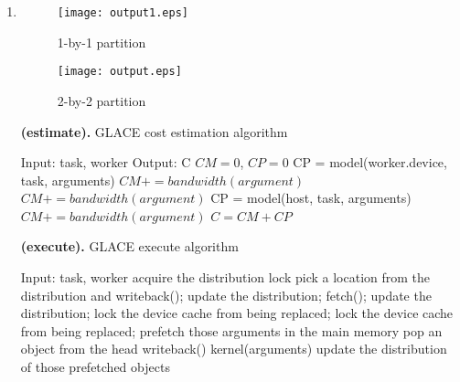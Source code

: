 \documentclass[preprint,11pt]{elsarticle}
\begin{document}
\begin{enumerate}
\item
\begin{figure}
  \centering
  \texttt{[image: output1.eps]} 
  \caption{1-by-1 partition}
  \label{fig:dep1}
\end{figure}
\begin{figure}
  \centering
  \texttt{[image: output.eps]} 
  \caption{2-by-2 partition}
  \label{fig:dep2}
\end{figure}

\begin{algorithm}
\caption{{\bf (estimate).} GLACE cost estimation algorithm}
\label{alg:est}
\begin{algorithmic}
\STATE Input: task, worker
\STATE Output: C
\STATE $CM = 0$, $CP = 0$
  \STATE CP = model(worker.device, task, arguments)
      \STATE $CM += bandwidth(argument)$
        \STATE $CM += bandwidth(argument)$
      \ENDIF
    \ENDIF
  \ENDFOR 
\ELSE
  \STATE CP = model(host, task, arguments)
      \STATE $CM += bandwidth(argument)$
    \ENDIF
  \ENDFOR 
\ENDIF
\STATE $C = CM + CP$
\end{algorithmic}
\end{algorithm}

\begin{algorithm}
\caption{{\bf (execute).} GLACE execute algorithm}
\label{alg:exe}
\begin{algorithmic}
\STATE Input: task, worker
  \STATE acquire the distribution lock
        \STATE pick a location from the distribution and writeback();
        \STATE update the distribution;
      \ENDIF
        \STATE fetch();
        \STATE update the distribution;
      \ENDIF
      \STATE lock the device cache from being replaced; 
    \ELSE
      \STATE lock the device cache from being replaced; 
    \ENDIF
  \ENDIF
\ENDFOR
{}
  \STATE prefetch those arguments in the main memory
\ENDIF
{}
  \STATE pop an object from the head
  \STATE writeback() 
\ENDIF
\STATE kernel(arguments)
  \STATE update the distribution of those prefetched objects
\ENDIF
\end{algorithmic}
\end{algorithm}


\end{enumerate}
\end{document}
